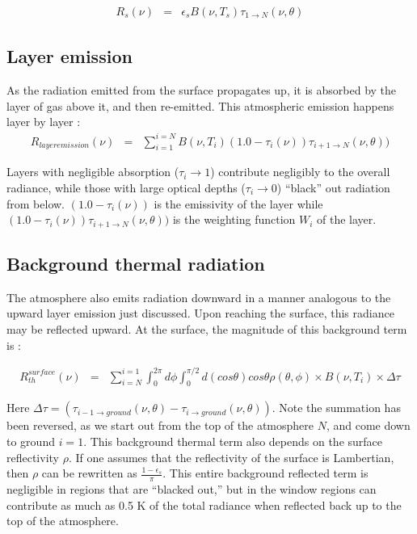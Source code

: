 \documentclass[11pt]{article}
\begin{document}
\begin{eqnarray*}
R_{s}(\nu) & = & \epsilon_{s} B(\nu,T_{s}) \tau_{1 \rightarrow N}(\nu,\theta)
\end{eqnarray*}

\subsection{Layer emission}

As the radiation emitted from the surface propagates up, it is absorbed by
the layer of gas above it, and then re-emitted. This atmospheric emission
happens layer by layer :
\begin{eqnarray*}
R_{layer emission}(\nu) & = & \sum_{i=1}^{i=N} B(\nu,T_{i})
(1.0 - \tau_{i}(\nu)) \tau_{i+1 \rightarrow N}(\nu,\theta))
\end{eqnarray*}

Layers with negligible absorption ($\tau_{i} \rightarrow 1$) contribute
negligibly to the overall radiance, while those with large optical depths
 ($\tau_{i} \rightarrow 0$) ``black'' out radiation from below.
$(1.0 - \tau_{i}(\nu))$ is the emissivity of the layer while
$(1.0 - \tau_{i}(\nu)) \tau_{i+1 \rightarrow N}(\nu,\theta))$ is the weighting
function $W_{i}$ of the layer.

\subsection{Background thermal radiation}

The atmosphere also emits radiation downward in a manner analogous to the
upward layer emission just discussed. Upon reaching the surface, this
radiance may be reflected upward. At the surface, the magnitude of this
background term is :

\begin{eqnarray}
R_{th}^{surface}(\nu) & = & \sum_{i=N}^{i=1}
\int_{0}^{2\pi}d\phi
\int_{0}^{\pi/2} d(cos\theta) cos\theta \rho(\theta,\phi)
\times B(\nu,T_{i}) \times \Delta \tau
\label{bckgnd_eqn}
\end{eqnarray}

\noindent Here $ \Delta \tau = (\tau_{i-1 \rightarrow ground}(\nu,\theta)-
 \tau_{i \rightarrow ground}(\nu,\theta))$.
Note the summation has been reversed, as we start out from the top of the
atmosphere $N$, and come down to ground $i=1$.
This background thermal term also depends on the surface reflectivity $\rho$.
If one assumes that the reflectivity of the surface is Lambertian, then $\rho$
can be rewritten as $\frac{1 - \epsilon_{s}}{\pi}$. This entire background
reflected term is negligible in regions that are ``blacked out,'' but in
the window regions can contribute as much as 0.5 K of the total radiance when
reflected back up to the top of the atmosphere.
\end{document}
